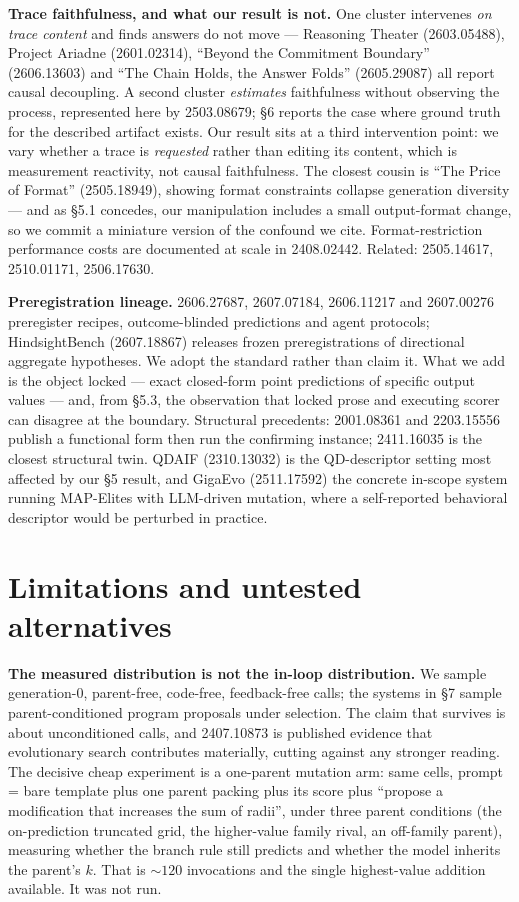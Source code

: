 \documentclass[11pt]{article}
\begin{document}
\textbf{Trace faithfulness, and what our result is not.} One cluster intervenes \textit{on trace content}
and finds answers do not move --- Reasoning Theater (2603.05488), Project Ariadne (2601.02314),
``Beyond the Commitment Boundary'' (2606.13603) and ``The Chain Holds, the Answer Folds''
(2605.29087) all report causal decoupling. A second cluster \textit{estimates} faithfulness without
observing the process, represented here by 2503.08679; \S6 reports the case where ground truth
for the described artifact exists. Our result sits at a third intervention point: we vary
whether a trace is \textit{requested} rather than editing its content, which is measurement reactivity,
not causal faithfulness. The closest cousin is ``The Price of Format'' (2505.18949), showing
format constraints collapse generation diversity --- and as \S5.1 concedes, our manipulation
includes a small output-format change, so we commit a miniature version of the confound we cite.
Format-restriction performance costs are documented at scale in 2408.02442. Related:
2505.14617, 2510.01171, 2506.17630.

\textbf{Preregistration lineage.} 2606.27687, 2607.07184, 2606.11217 and 2607.00276 preregister
recipes, outcome-blinded predictions and agent protocols; HindsightBench (2607.18867) releases
frozen preregistrations of directional aggregate hypotheses. We adopt the standard rather than
claim it. What we add is the object locked --- exact closed-form point predictions of specific
output values --- and, from \S5.3, the observation that locked prose and executing scorer can
disagree at the boundary. Structural precedents: 2001.08361 and 2203.15556 publish a functional
form then run the confirming instance; 2411.16035 is the closest structural twin. QDAIF
(2310.13032) is the QD-descriptor setting most affected by our \S5 result, and GigaEvo
(2511.17592) the concrete in-scope system running MAP-Elites with LLM-driven mutation, where a
self-reported behavioral descriptor would be perturbed in practice.

\section{Limitations and untested alternatives}

\textbf{The measured distribution is not the in-loop distribution.} We sample generation-0,
parent-free, code-free, feedback-free calls; the systems in \S7 sample parent-conditioned program
proposals under selection. The claim that survives is about unconditioned calls, and 2407.10873
is published evidence that evolutionary search contributes materially, cutting against any
stronger reading. The decisive cheap experiment is a one-parent mutation arm: same cells,
prompt = bare template plus one parent packing plus its score plus ``propose a modification that
increases the sum of radii'', under three parent conditions (the on-prediction truncated grid,
the higher-value family rival, an off-family parent), measuring whether the branch rule still
predicts and whether the model inherits the parent's $k$. That is ${\sim}120$ invocations and the single
highest-value addition available. It was not run.
\end{document}
